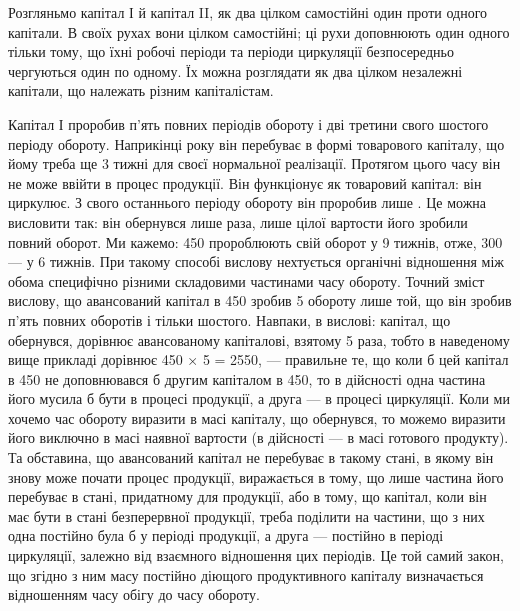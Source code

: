 Розгляньмо капітал І й капітал II, як два цілком самостійні один проти
одного капітали. В своїх рухах вони цілком самостійні; ці рухи доповнюють
один одного тільки тому, що їхні робочі періоди та періоди
циркуляції безпосередньо чергуються один по одному. Їх можна розглядати
як два цілком незалежні капітали, що належать різним капіталістам.

Капітал І проробив п’ять повних періодів обороту і дві третини свого
шостого періоду обороту. Наприкінці року він перебуває в формі товарового
капіталу, що йому треба ще 3 тижні для своєї нормальної реалізації.
Протягом цього часу він не може ввійти в процес продукції.
Він функціонує як товаровий капітал: він циркулює. З свого останнього
періоду обороту він проробив лише . Це можна висловити так: він
обернувся лише  раза, лише  цілої вартости його зробили повний оборот.
Ми кажемо: 450 пророблюють свій оборот у 9 тижнів, отже,
300 — у 6 тижнів. При такому способі вислову нехтується органічні
відношення між обома специфічно різними складовими частинами часу обороту.
Точний зміст вислову, що авансований капітал в 450 зробив
5 обороту лише той, що він зробив п’ять повних оборотів і тільки
 шостого. Навпаки, в вислові: капітал, що обернувся, дорівнює
авансованому капіталові, взятому 5 раза, тобто в наведеному вище прикладі
дорівнює 450 × 5 = 2550, — правильне те, що
коли б цей капітал в 450 не доповнювався б другим капіталом
в 450, то в дійсності одна частина його мусила б бути в процесі
продукції, а друга — в процесі циркуляції. Коли ми хочемо час обороту
виразити в масі капіталу, що обернувся, то можемо виразити його
виключно в масі наявної вартости (в дійсності — в масі готового продукту).
Та обставина, що авансований капітал не перебуває в такому
стані, в якому він знову може почати процес продукції, виражається в
тому, що лише частина його перебуває в стані, придатному для продукції,
або в тому, що капітал, коли він має бути в стані безперервної продукції,
треба поділити на частини, що з них одна постійно була б у періоді
продукції, а друга — постійно в періоді циркуляції, залежно від взаємного
відношення цих періодів. Це той самий закон, що згідно з ним
масу постійно діющого продуктивного капіталу визначається відношенням
часу обігу до часу обороту.

